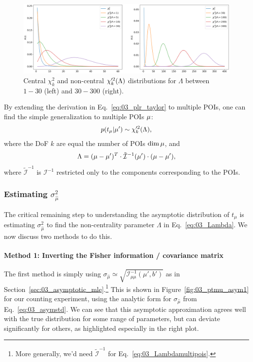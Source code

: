 \begin{figure}[htb]
  \centering
  \includegraphics[width=\textwidth]{figures/03-Stats/06-asymptotic-plr/1.png}
  \caption{Central $\chi^2_k$ and non-central $\chi^{\prime 2}_k(\Lambda)$ distributions for $\Lambda$ between $1-30$ (left) and $30-300$ (right).}
  \label{fig:03_noncentralchi2}
\end{figure}

By extending the derivation in Eq.~\ref{eq:03_plr_taylor} to multiple POIs, one can find the simple generalization to multiple POIs $\mathbf{\mu}$:
\begin{equation}
p(t_\mu|\mu') \sim \chi^{\prime 2}_k(\Lambda),
\label{eq:03_chi2multipois}
\end{equation}
where the DoF $k$ are equal the number of POIs $\dim\mathbf{\mu}$, and
\begin{equation}
\Lambda = (\mathbf{\mu} - \mathbf{\mu}')^T \cdot \tilde{\mathcal I}^{-1}(\mathbf{\mu}') \cdot (\mathbf{\mu} - \mathbf{\mu}'),
\label{eq:03_Lambdamultipois}
\end{equation}
where $\tilde{\mathcal I}^{-1}$ is $\mathcal I^{-1}$ restricted only to the components corresponding to the POIs.


\subsubsection{Estimating \texorpdfstring{$\sigma_{\hat\mu}^2$}{σ2}}

The critical remaining step to understanding the asymptotic distribution of $t_\mu$ is estimating $\sigma_{\hat\mu}^2$ to find the non-centrality parameter $\Lambda$ in Eq.~\ref{eq:03_Lambda}.
We now discuss two methods to do this.

\paragraph{Method 1: Inverting the Fisher information / covariance matrix}

The first method is simply using $\sigma_{\hat\mu} \simeq \sqrt{\mathcal I^{-1}_{\mu\mu}(\mu', b')}$ as in Section~\ref{sec:03_asymptotic_mle}.\footnote{More generally, we'd need $\tilde{\mathcal I}^{-1}$ for Eq.~\ref{eq:03_Lambdamultipois}.}
This is shown in Figure~\ref{fig:03_ptmu_asym1} for our counting experiment, using the analytic form for $\sigma_{\hat\mu}$ from Eq.~\ref{eq:03_asymstd}.
We can see that this asymptotic approximation agrees well with the true distribution for some range of parameters, but can deviate significantly for others, as highlighted especially in the right plot.

